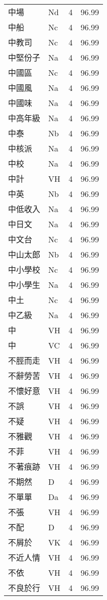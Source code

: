 \documentclass[twocolumn]{book}
\begin{document}
\begin{supertabular}{llrr}
中場 & Nd & 4 &  96.99\\
中船 & Nc & 4 &  96.99\\
中教司 & Nc & 4 &  96.99\\
中堅份子 & Na & 4 &  96.99\\
中國區 & Nc & 4 &  96.99\\
中國風 & Na & 4 &  96.99\\
中國味 & Na & 4 &  96.99\\
中高年級 & Na & 4 &  96.99\\
中泰 & Nb & 4 &  96.99\\
中核派 & Na & 4 &  96.99\\
中校 & Na & 4 &  96.99\\
中計 & VH & 4 &  96.99\\
中英 & Nb & 4 &  96.99\\
中低收入 & Na & 4 &  96.99\\
中日文 & Na & 4 &  96.99\\
中文台 & Nc & 4 &  96.99\\
中山太郎 & Nb & 4 &  96.99\\
中小學校 & Nc & 4 &  96.99\\
中小學生 & Na & 4 &  96.99\\
中土 & Nc & 4 &  96.99\\
中乙級 & Na & 4 &  96.99\\
中 & VH & 4 &  96.99\\
中 & VC & 4 &  96.99\\
不脛而走 & VH & 4 &  96.99\\
不辭勞苦 & VH & 4 &  96.99\\
不懷好意 & VH & 4 &  96.99\\
不誤 & VH & 4 &  96.99\\
不疑 & VH & 4 &  96.99\\
不雅觀 & VH & 4 &  96.99\\
不菲 & VH & 4 &  96.99\\
不著痕跡 & VH & 4 &  96.99\\
不期然 & D & 4 &  96.99\\
不單單 & Da & 4 &  96.99\\
不張 & VH & 4 &  96.99\\
不配 & D & 4 &  96.99\\
不屑於 & VK & 4 &  96.99\\
不近人情 & VH & 4 &  96.99\\
不依 & VH & 4 &  96.99\\
不良於行 & VH & 4 &  96.99\\

\end{supertabular}
\end{document}
